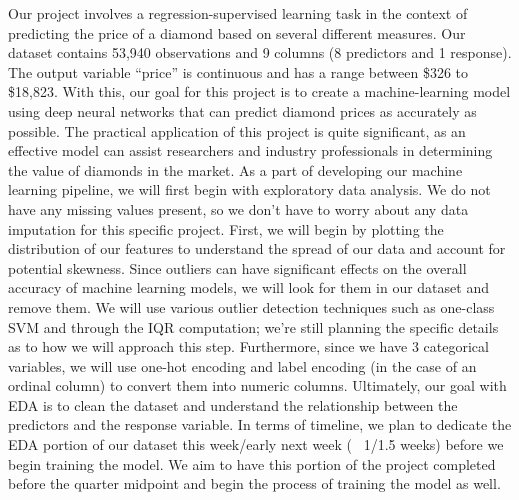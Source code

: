 \documentclass[conference]{IEEEtran}
\begin{document}
Our project involves a regression-supervised learning task in the context of predicting the price of a diamond based on several different measures. Our dataset contains 53,940 observations and 9 columns (8 predictors and 1 response). The output variable “price” is continuous and has a range between \$326 to \$18,823. With this, our goal for this project is to create a machine-learning model using deep neural networks that can predict diamond prices as accurately as possible. The practical application of this project is quite significant, as an effective model can assist researchers and industry professionals in determining the value of diamonds in the market. 
As a part of developing our machine learning pipeline, we will first begin with exploratory data analysis. We do not have any missing values present, so we don’t have to worry about any data imputation for this specific project. First, we will begin by plotting the distribution of our features to understand the spread of our data and account for potential skewness. Since outliers can have significant effects on the overall accuracy of machine learning models, we will look for them in our dataset and remove them. We will use various outlier detection techniques such as one-class SVM and through the IQR computation; we're still planning the specific details as to how we will approach this step. Furthermore, since we have 3 categorical variables, we will use one-hot encoding and label encoding (in the case of an ordinal column) to convert them into numeric columns. Ultimately, our goal with EDA is to clean the dataset and understand the relationship between the predictors and the response variable. In terms of timeline, we plan to dedicate the EDA portion of our dataset this week/early next week (~ 1/1.5 weeks) before we begin training the model. We aim to have this portion of the project completed before the quarter midpoint and begin the process of training the model as well.
\end{document}
